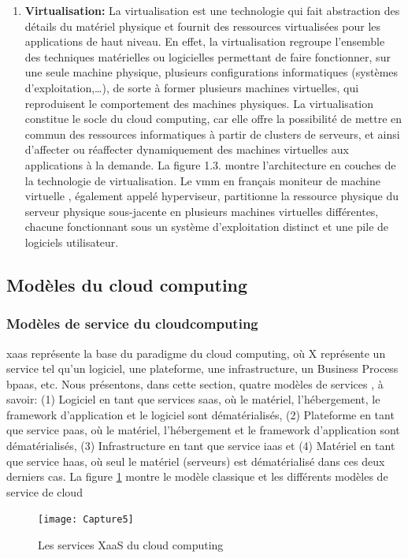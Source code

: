 \begin{enumerate}
\item \textbf{Virtualisation: } La virtualisation est une technologie qui fait abstraction des détails du matériel physique et fournit des ressources virtualisées pour les applications de haut niveau. En effet, la virtualisation regroupe l’ensemble des techniques matérielles ou logicielles permettant de faire fonctionner, sur une seule machine physique, plusieurs configurations informatiques (systèmes d’exploitation,…), de sorte à former plusieurs machines virtuelles, qui reproduisent le comportement des machines physiques. La virtualisation constitue le socle du cloud computing, car elle offre la possibilité de mettre en commun des ressources informatiques à partir de clusters de serveurs, et ainsi d’affecter ou réaffecter dynamiquement des machines virtuelles aux applications à la demande. La figure 1.3. montre l’architecture en couches de la technologie de virtualisation. Le  \ac{vmm} en français moniteur de machine virtuelle ,  également appelé hyperviseur, partitionne la ressource physique du serveur physique sous-jacente en plusieurs machines virtuelles  différentes, chacune fonctionnant sous un système d'exploitation distinct et une pile de logiciels utilisateur. 
\end{enumerate}














\subsection{Modèles du cloud computing  }
\subsubsection {Modèles de service du cloudcomputing}  
\ac{xaas} représente la base du paradigme du cloud computing, où X représente un service tel qu’un logiciel, une plateforme, une infrastructure, un Business Process \ac{bpaas}, etc. Nous présentons, dans cette section,  quatre  modèles de services \parencite{Rimal}, à savoir: (1) Logiciel en tant que services \ac{saas},  où le matériel, l’hébergement, le framework d’application et le logiciel sont dématérialisés, (2) Plateforme en tant que service \ac{paas}, où le matériel, l’hébergement et le framework d’application sont dématérialisés, (3) Infrastructure en tant que service \ac{iaas} et (4) Matériel en tant que service \ac{haas}, où seul le matériel (serveurs) est dématérialisé dans ces deux derniers cas. La figure \ref{fig:capture5} montre le modèle classique et les différents modèles de service de cloud
\begin{figure}[h]
	\centering
	\texttt{[image: Capture5]}
	\caption{Les services XaaS du cloud computing}
	\label{fig:capture5}
\end{figure}

